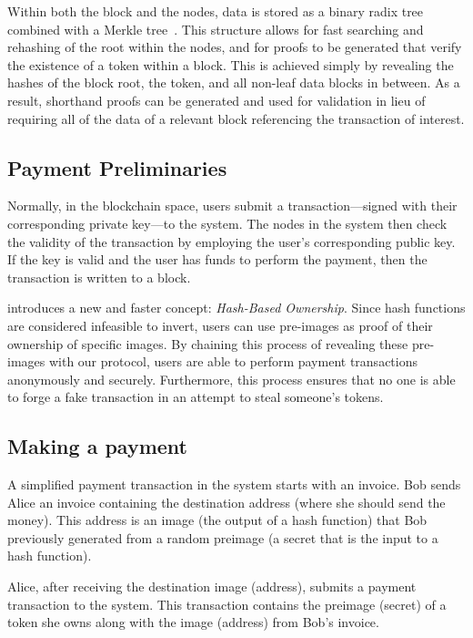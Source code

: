 Within both the block and the nodes, data is stored as a binary radix tree combined with a Merkle tree~\cite{merkle}. This structure allows for fast searching and rehashing of the root within the nodes, and for proofs to be generated that verify the existence of a token within a block. This is achieved simply by revealing the hashes of the block root, the token, and all non-leaf data blocks in between. As a result, shorthand proofs can be generated and used for validation in lieu of requiring all of the data of a relevant block referencing the transaction of interest. 

\subsection{Payment Preliminaries}

Normally, in the blockchain space, users submit a transaction---signed with their corresponding private key---to the system. The nodes in the system then check the validity of the transaction by employing the user's corresponding public key. If the key is valid and the user has funds to perform the payment, then the transaction is written to a block. 

\name introduces a new and faster concept: \textit{Hash-Based Ownership}. Since hash functions are considered infeasible to invert, users can use pre-images as proof of their ownership of specific images. By chaining this process of revealing these pre-images with our \name protocol, users are able to perform payment transactions anonymously and securely. Furthermore, this process ensures that no one is able to forge a fake transaction in an attempt to steal someone's tokens.

\subsection{Making a payment}

A simplified payment transaction in the system starts with an invoice. Bob sends Alice an invoice containing the destination address (where she should send the money). This address is an image (the output of a hash function) that Bob previously generated from a random preimage (a secret that is the input to a hash function).
    
Alice, after receiving the destination image (address), submits a payment transaction to the system. This transaction contains the preimage (secret) of a token she owns along with the image (address) from Bob's invoice.
    
